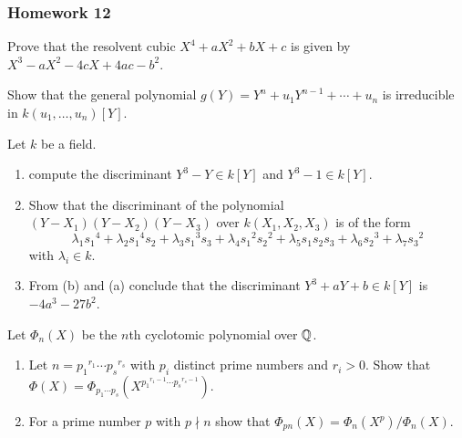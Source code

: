 \subsubsection{Homework 12}
\begin{problem}
  Prove that the resolvent cubic $X^4+aX^2+bX+c$ is given by
  $X^3-aX^2-4cX+4ac-b^2$.
\end{problem}
\begin{solution}
\end{solution}

\begin{problem}
  Show that the general polynomial $g(Y)=Y^n+u_1Y^{n-1}+\dotsb+u_n$ is
  irreducible in $k(u_1,\dotsc,u_n)[Y]$.
\end{problem}
\begin{solution}
\end{solution}

\begin{problem}
  Let $k$ be a field.
  \begin{enumerate}[label=(\alph*),noitemsep]
  \item compute the discriminant $Y^3-Y\in k[Y]$ and $Y^3-1\in k[Y]$.
  \item Show that the discriminant of the polynomial
    $(Y-X_1)(Y-X_2)(Y-X_3)$ over $k(X_1,X_2,X_3)$ is of the form
    \[
      \lambda_1{s_1}^4+\lambda_2{s_1}^4s_2+\lambda_3{s_1}^3s_3+\lambda_4{s_1}^2{s_2}^2+\lambda_5s_1s_2s_3+\lambda_6{s_2}^3+\lambda_7{s_3}^2
    \]
    with $\lambda_i\in k$.
  \item From (b) and (a) conclude that the discriminant
    $Y^3+aY+b\in k[Y]$ is $-4a^3-27b^2$.
\end{enumerate}
\end{problem}
\begin{solution}
\end{solution}

\begin{problem}
  Let $\Phi_n(X)$ be the $n$th cyclotomic polynomial over $\mathbb{Q}$.
  \begin{enumerate}[label=(\alph*),noitemsep]
  \item Let $n={p_1}^{r_1}\dotsm{p_s}^{r_s}$ with $p_i$ distinct prime
    numbers and $r_i>0$. Show that
    $\Phi(X)=\Phi_{p_1\dotsm p_s}(X^{{p_1}^{r_1-1}\dotsm{p_s}^{r_s-1}})$.
  \item For a prime number $p$ with $p\nmid n$ show that
    $\Phi_{pn}(X)=\Phi_n(X^p)/\Phi_n(X)$.
  \end{enumerate}
\end{problem}
\begin{solution}
\end{solution}

